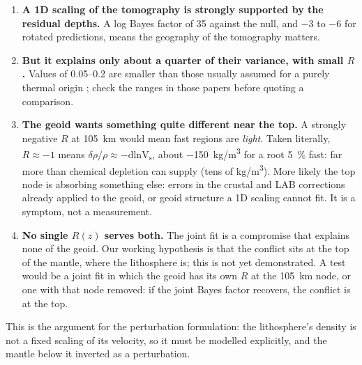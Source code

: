 \begin{enumerate}[nosep]
\item \textbf{A 1D scaling of the tomography is strongly supported by the residual depths.}
A log Bayes factor of 35 against the null, and $-3$ to $-6$ for rotated predictions, means the geography of the tomography matters.
\item \textbf{But it explains only about a quarter of their variance, with small $R$.}
Values of \numrange{0.05}{0.2} are smaller than those usually assumed for a purely thermal origin \citep[e.g.][]{karato1993importance,cammarano2003inferring}; check the ranges in those papers before quoting a comparison.
\item \textbf{The geoid wants something quite different near the top.}
A strongly negative $R$ at \qty{105}{km} would mean fast regions are \emph{light}.
Taken literally, $R\approx-1$ means $\delta\rho/\rho\approx-\mathrm{dlnV_s}$, about \qty{-150}{kg/m^3} for a root \qty{5}{\percent} fast: far more than chemical depletion can supply (tens of \si{kg/m^3}).
More likely the top node is absorbing something else: errors in the crustal and LAB corrections already applied to the geoid, or geoid structure a 1D scaling cannot fit.
It is a symptom, not a measurement.
\item \textbf{No single $R(z)$ serves both.}
The joint fit is a compromise that explains none of the geoid.
Our working hypothesis is that the conflict sits at the top of the mantle, where the lithosphere is; this is not yet demonstrated.
A test would be a joint fit in which the geoid has its own $R$ at the \qty{105}{km} node, or one with that node removed: if the joint Bayes factor recovers, the conflict is at the top.
\end{enumerate}
This is the argument for the perturbation formulation: the lithosphere's density is not a fixed scaling of its velocity, so it must be modelled explicitly, and the mantle below it inverted as a perturbation.

